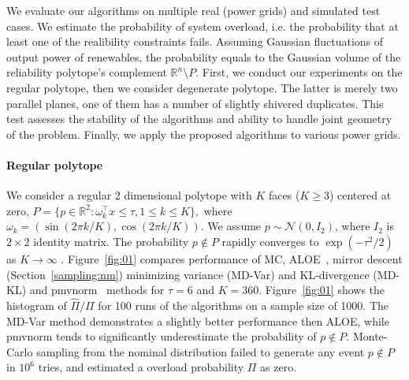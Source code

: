 We evaluate our algorithms on multiple real (power grids) and simulated test cases. We estimate the probability of system overload, i.e. the probability that at least one of the realibility constraints fails. Assuming Gaussian fluctuations of output power of renewables, the  probability equals to the Gaussian volume of the reliability polytope's complement $\mathbb{R}^n\setminus P$. First, we conduct our experiments on the regular polytope, then we consider degenerate polytope. The latter is merely two parallel planes, one of them has a number of slightly shivered duplicates. This test assesses the stability of the algorithms and ability to handle joint geometry of the problem. Finally, we apply the proposed algorithms to various power grids. 

\paragraph{Regular polytope}
We consider a regular 2 dimensional polytope with $K$ faces ($K\ge 3$) centered at zero, $
    P = \{p \in \mathbb{R}^2: \omega_k^\top x \leq \tau, 1\le k \le K\},
$
where $\omega_k = (\sin(2\pi k/K), \cos(2 \pi k/K))$. 
We assume $p\sim\mathcal{N}(0, I_2)$, where $I_2$ is $2\times 2$ identity matrix. The probability $p\not\in P$ rapidly converges to $\exp(-\tau^2/2)$ as $K\to\infty$ \cite{owen2019importance}. %
Figure~\ref{fig:01} compares performance of MC,  ALOE~\cite{owen2019importance}, mirror descent (Section~\ref{sampling:nm}) minimizing variance (MD-Var) and KL-divergence (MD-KL) and pmvnorm~\cite{genz2020package} methods for $\tau = 6$ and $K = 360$. Figure~\ref{fig:01} shows the histogram of $\hat \Pi/\Pi$ for 100 runs of the algorithms on a sample size of 1000. %
 The MD-Var method demonstrates a slightly better performance then ALOE, while pmvnorm tends to significantly underestimate the probability of $p\not\in P$. Monte-Carlo sampling from the nominal distribution failed to generate any event $p\not\in P$ in $10^6$ tries, and estimated a overload probability $\Pi$ as zero.


